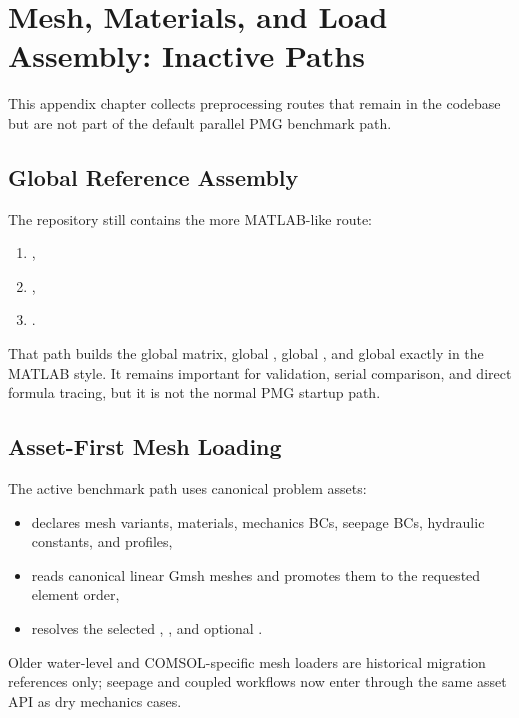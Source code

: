 \chapter{Mesh, Materials, and Load Assembly: Inactive Paths}
\label{app:mesh}

This appendix chapter collects preprocessing routes that remain in the codebase
but are not part of the default parallel PMG benchmark path.

\section{Global Reference Assembly}

The repository still contains the more MATLAB-like route:
\begin{enumerate}
\item {},
\item {},
\item {}.
\end{enumerate}

That path builds the global  matrix, global , global
, and global  exactly in the MATLAB style. It remains
important for validation, serial comparison, and direct formula tracing, but it
is not the normal PMG startup path.

\section{Asset-First Mesh Loading}

The active benchmark path uses canonical problem assets:
\begin{itemize}
\item {} declares mesh variants, materials,
mechanics BCs, seepage BCs, hydraulic constants, and profiles,
\item {} reads canonical linear Gmsh
meshes and promotes them to the requested element order,
\item {} resolves the selected
, , and optional .
\end{itemize}

Older water-level and COMSOL-specific mesh loaders are historical migration
references only; seepage and coupled workflows now enter through the same asset
API as dry mechanics cases.

